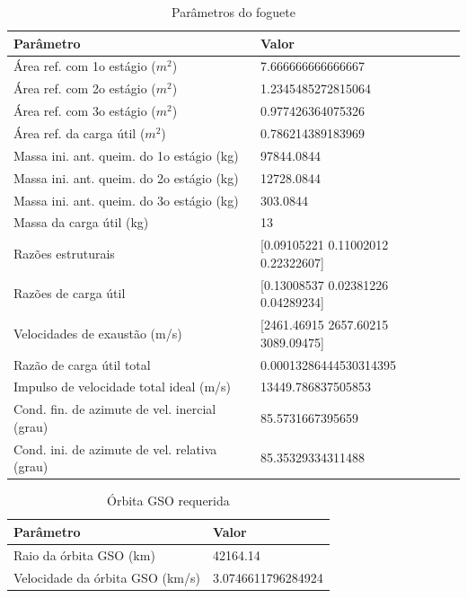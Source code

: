 \begin{table}[H]
\centering
\caption{Parâmetros do foguete}
\begin{tabular}{|l|l|}
\hline
\textbf{Parâmetro} & \textbf{Valor} \\
\hline
Área ref. com 1o estágio ($m^2$) & 7.666666666666667 \\
Área ref. com 2o estágio ($m^2$) & 1.2345485272815064 \\
Área ref. com 3o estágio ($m^2$) & 0.977426364075326 \\
Área ref. da carga útil ($m^2$) & 0.786214389183969 \\
Massa ini. ant. queim. do 1o estágio (kg) & 97844.0844 \\
Massa ini. ant. queim. do 2o estágio (kg) & 12728.0844 \\
Massa ini. ant. queim. do 3o estágio (kg) & 303.0844 \\
Massa da carga útil (kg) & 13 \\
Razões estruturais & [0.09105221 0.11002012 0.22322607] \\
Razões de carga útil & [0.13008537 0.02381226 0.04289234] \\
Velocidades de exaustão (m/s) & [2461.46915 2657.60215 3089.09475] \\
Razão de carga útil total & 0.00013286444530314395 \\
Impulso de velocidade total ideal (m/s) & 13449.786837505853 \\
Cond. fin. de azimute de vel. inercial (grau) & 85.5731667395659 \\
Cond. ini. de azimute de vel. relativa (grau) & 85.35329334311488 \\
\hline
\end{tabular}

\end{table}

\begin{table}[H]
\centering
\caption{Órbita GSO requerida}
\begin{tabular}{|l|l|}
\hline
\textbf{Parâmetro} & \textbf{Valor} \\
\hline
Raio da órbita GSO (km) & 42164.14 \\
Velocidade da órbita GSO (km/s) & 3.0746611796284924 \\
\hline
\end{tabular}

\end{table}

